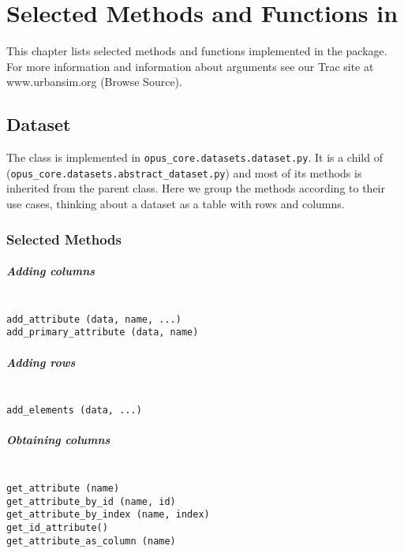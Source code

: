 
\chapter{Selected Methods and Functions in }
\label{appendix:selected-methods}
%
This chapter lists selected methods and functions implemented in the  package.
For more information and information about arguments see our Trac site at www.urbansim.org (Browse Source).

%
\section{Dataset}
%
\label{appendix:selected-methods-dataset}
%
The class  is implemented in
\verb|opus_core.datasets.dataset.py|. 
It is a child of  (\verb|opus_core.datasets.abstract_dataset.py|)
and most of its methods is inherited from the parent class. Here we group the methods 
according to their use cases, thinking about a dataset as a table with rows and columns.

%
\subsection{Selected Methods}
%
\paragraph{Adding columns}~\\[1mm]
{\tt add\_attribute (data, name, ...)}\\
{\tt add\_primary\_attribute (data, name)}

\paragraph{Adding rows}~\\[1mm]
{\tt add\_elements (data, ...)}

\paragraph{Obtaining columns}~\\[1mm]
{\tt get\_attribute (name)} \\
{\tt get\_attribute\_by\_id (name, id)} \\
{\tt get\_attribute\_by\_index (name, index)}\\
{\tt get\_id\_attribute()} \\
{\tt get\_attribute\_as\_column (name)}

